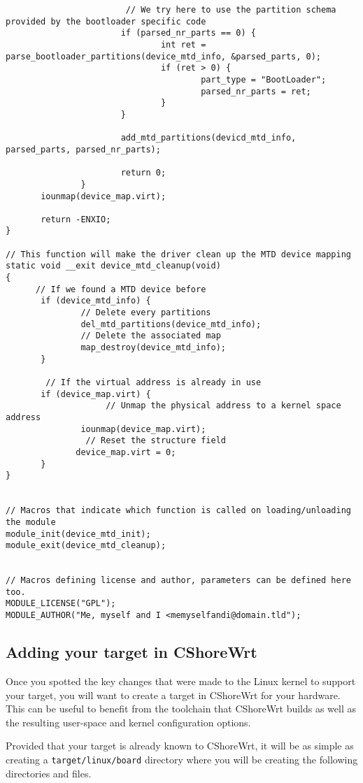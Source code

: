 \begin{verbatim}
						// We try here to use the partition schema provided by the bootloader specific code
                       if (parsed_nr_parts == 0) {
                               int ret = parse_bootloader_partitions(device_mtd_info, &parsed_parts, 0);
                               if (ret > 0) {
                                       part_type = "BootLoader";
                                       parsed_nr_parts = ret;
                               }
                       }

                       add_mtd_partitions(devicd_mtd_info, parsed_parts, parsed_nr_parts);

                       return 0;
               }
       iounmap(device_map.virt);

       return -ENXIO;
}

// This function will make the driver clean up the MTD device mapping
static void __exit device_mtd_cleanup(void)
{
	  // If we found a MTD device before
       if (device_mtd_info) {
			   // Delete every partitions
               del_mtd_partitions(device_mtd_info);
			   // Delete the associated map
               map_destroy(device_mtd_info);
       }
	
		// If the virtual address is already in use
       if (device_map.virt) {
					// Unmap the physical address to a kernel space address
               iounmap(device_map.virt);
				// Reset the structure field
              device_map.virt = 0;
       }
}


// Macros that indicate which function is called on loading/unloading the module
module_init(device_mtd_init);
module_exit(device_mtd_cleanup);


// Macros defining license and author, parameters can be defined here too.
MODULE_LICENSE("GPL");
MODULE_AUTHOR("Me, myself and I <memyselfandi@domain.tld");
\end{verbatim}

\subsection{Adding your target in CShoreWrt}

Once you spotted the key changes that were made to the Linux kernel
to support your target, you will want to create a target in CShoreWrt
for your hardware. This can be useful to benefit from the toolchain
that CShoreWrt builds as well as the resulting user-space and kernel
configuration options.

Provided that your target is already known to CShoreWrt, it will be
as simple as creating a \texttt{target/linux/board} directory
where you will be creating the following directories and files.


